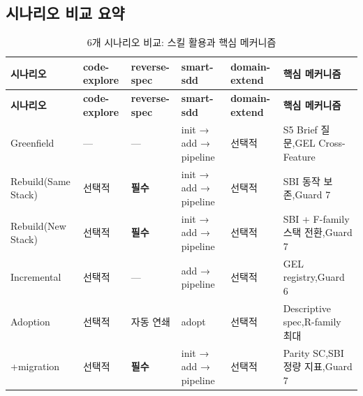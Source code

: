 \documentclass[11pt,a4paper,openright,twoside]{report}
\begin{document}
\subsection{시나리오 비교 요약}
\label{sec:ref-comparison}

\begin{longtable}{p{2.5cm}p{2cm}p{2cm}p{2cm}p{2cm}p{2.5cm}}
\caption{6개 시나리오 비교: 스킬 활용과 핵심 메커니즘} \label{tab:scenario-comparison} \\
\toprule
\textbf{시나리오} & \textbf{code-explore} & \textbf{reverse-spec} & \textbf{smart-sdd} & \textbf{domain-extend} & \textbf{핵심 메커니즘} \\
\midrule
\endfirsthead
\toprule
\textbf{시나리오} & \textbf{code-explore} & \textbf{reverse-spec} & \textbf{smart-sdd} & \textbf{domain-extend} & \textbf{핵심 메커니즘} \\
\midrule
\endhead
\bottomrule
\endfoot

Greenfield &
  --- &
  --- &
  init → add → pipeline &
  선택적 &
  S5 Brief 질문,\newline GEL Cross-Feature \\
\midrule

Rebuild\newline (Same Stack) &
  선택적 &
  \textbf{필수} &
  init → add → pipeline &
  선택적 &
  SBI 동작 보존,\newline Guard 7 \\
\midrule

Rebuild\newline (New Stack) &
  선택적 &
  \textbf{필수} &
  init → add → pipeline &
  선택적 &
  SBI + F-family\newline 스택 전환,\newline Guard 7 \\
\midrule

Incremental &
  선택적 &
  --- &
  add → pipeline &
  선택적 &
  GEL registry,\newline Guard 6 \\
\midrule

Adoption &
  선택적 &
  자동 연쇄 &
  adopt &
  선택적 &
  Descriptive spec,\newline R-family 최대 \\
\midrule

+migration &
  선택적 &
  \textbf{필수} &
  init → add → pipeline &
  선택적 &
  Parity SC,\newline SBI 정량 지표,\newline Guard 7 \\

\end{longtable}
\end{document}
